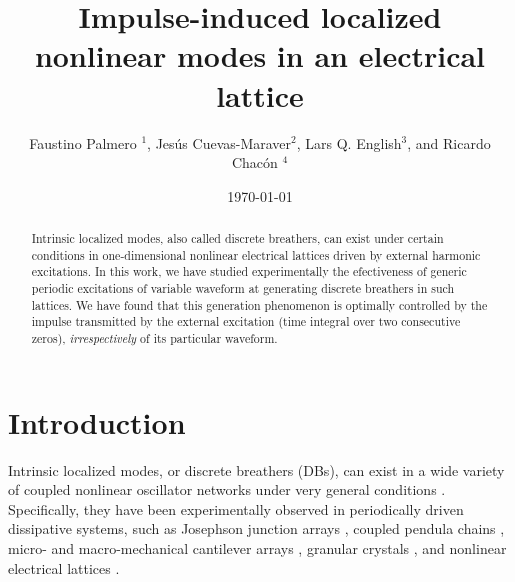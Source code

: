 \documentclass[showpacs,preprintnumbers,10pt,onecolumn]{revtex4}%
\begin{document}
\title{Impulse-induced localized nonlinear modes in an electrical lattice}
\author{Faustino Palmero $^{1}$, Jes\'{u}s Cuevas-Maraver$^{2}$, Lars Q. English$^{3}$,
and Ricardo Chac\'{o}n $^{4}$}
\date{\today}

\begin{abstract}
Intrinsic localized modes, also called discrete breathers, can exist under
certain conditions in one-dimensional nonlinear electrical lattices driven by
external harmonic excitations. In this work, we have studied experimentally the efectiveness of generic
periodic excitations of variable waveform at generating discrete breathers in
such lattices. We have found that this generation phenomenon is optimally
controlled by the impulse transmitted by the external excitation (time
integral over two consecutive zeros), \textit{irrespectively} of its particular
waveform.
\end{abstract}
\maketitle


\section{Introduction} Intrinsic localized modes, or
discrete breathers (DBs), can exist in a wide variety of coupled nonlinear
oscillator networks under very general conditions \cite{breather_reviews,
Aubry}. Specifically, they have been experimentally observed in periodically driven
dissipative systems, such as Josephson junction arrays \cite{JJ}, coupled
pendula chains \cite{pendula}, micro- and macro-mechanical cantilever arrays
\cite{cantilever}, granular crystals \cite{granular}, and nonlinear electrical
lattices \cite{electric1, electric2}.
\end{document}
